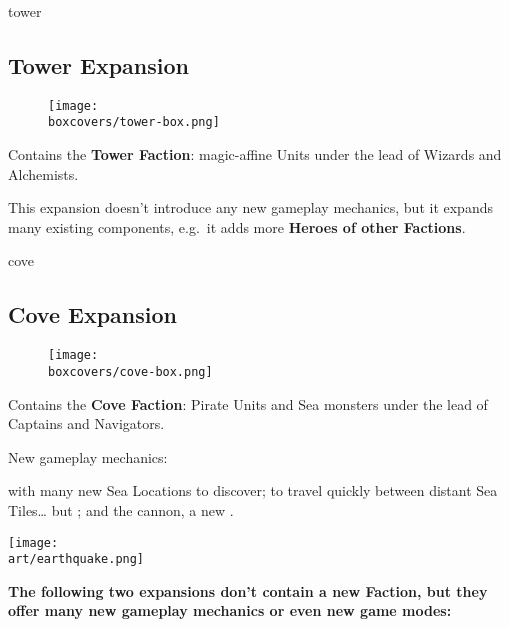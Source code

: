 \begin{multicols}{2}
\begin{expansion}[title=]{tower}
  \subsection*{\color{tower}Tower Expansion}
  \setlength\intextsep{0pt}
  \setlength\columnsep{0.8em}
  \begin{wrapfigure}{l}{0.35\textwidth}
    \texttt{[image: \\boxcovers/tower-box.png]}
  \end{wrapfigure}
  Contains the \textbf{Tower Faction}: magic-affine Units under the lead of Wizards and Alchemists.\par
  \medskip
  This expansion doesn't introduce any new gameplay mechanics, but it expands many existing components, e.g.~it adds more \textbf{Heroes of other Factions}.
\end{expansion}
\vspace*{\fill}
\columnbreak

\begin{expansion}[title=]{cove}
  \subsection*{\color{cove}Cove Expansion}
  \setlength\intextsep{0pt}
  \setlength\columnsep{0.8em}
  \begin{wrapfigure}{l}{0.35\textwidth}
    \texttt{[image: \\boxcovers/cove-box.png]}
  \end{wrapfigure}
  Contains the \textbf{Cove Faction}: Pirate Units and Sea monsters under the lead of Captains and Navigators.\par
  \medskip
  New gameplay mechanics:\par
  \smallskip
   with many new Sea Locations to discover;  to travel quickly between distant Sea Tiles… but ; and the cannon, a new .
\end{expansion}

\begin{center}
\hfill{}\texttt{[image: \\art/earthquake.png]}
\end{center}

\end{multicols}

\textbf{The following two expansions don't contain a new Faction, but they offer many new gameplay mechanics or even new game modes:}

